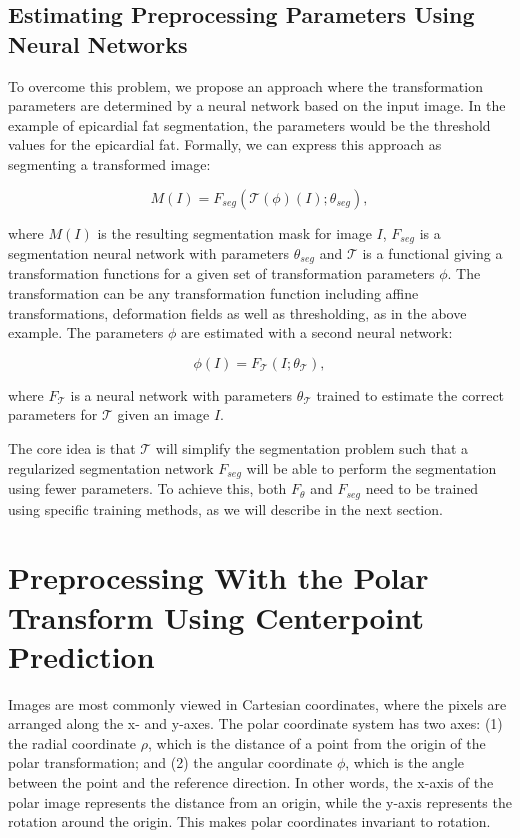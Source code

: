 \subsection{Estimating Preprocessing Parameters Using Neural Networks}

To overcome this problem, we propose an approach where the transformation parameters are determined by a neural network based on the input image. In the example of epicardial fat segmentation, the parameters would be the threshold values for the epicardial fat. Formally, we can express this approach as segmenting a transformed image:

\begin{equation}
	M(I) = F_{seg}(\mathcal{T}(\phi)(I); \theta_{seg}),
\end{equation}

where $M(I)$ is the resulting segmentation mask for image $I$, $F_{seg}$ is a segmentation neural network with parameters $\theta_{seg}$ and $\mathcal{T}$ is a functional giving a transformation functions for a given set of transformation parameters $\phi$. The transformation can be any transformation function including affine transformations, deformation fields as well as thresholding, as in the above example. The parameters $\phi$ are estimated with a second neural network:

\begin{equation}
	\phi(I) = F_{\mathcal{T}}(I; \theta_{\mathcal{T}}),
\end{equation}

where $F_{\mathcal{T}}$ is a neural network with parameters $\theta_{\mathcal{T}}$ trained to estimate the correct parameters for $\mathcal{T}$ given an image $I$.

The core idea is that $\mathcal{T}$ will simplify the segmentation problem such that a regularized segmentation network $F_{seg}$ will be able to perform the segmentation using fewer parameters. To achieve this, both $F_{\theta}$ and $F_{seg}$ need to be trained using specific training methods, as we will describe in the next section.


\section{Preprocessing With the Polar Transform Using Centerpoint Prediction}

Images are most commonly viewed in Cartesian coordinates, where the pixels are arranged along the x- and y-axes. The polar coordinate system has two axes: (1) the radial coordinate $
\rho$, which is the distance 
of a point from the origin of the polar transformation; and (2) the angular coordinate $\phi$, which is the angle 
between the point and the reference direction. In other words, the x-axis of the polar image represents the 
distance from an origin, while the y-axis represents the rotation around the origin. This makes polar coordinates 
invariant to rotation.

